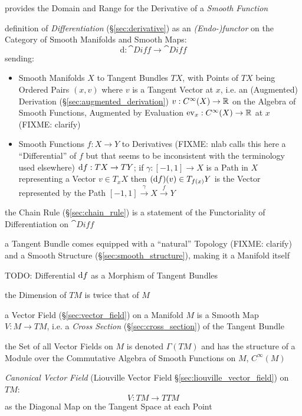 provides the Domain and Range for the Derivative of a \emph{Smooth Function}

definition of \emph{Differentiation} (\S\ref{sec:derivative}) as an
\emph{(Endo-)functor} on the Category of Smooth Manifolds and Smooth Maps:
\[
  \mathrm{d} : \cat{Diff} \rightarrow \cat{Diff}
\]
sending:
\begin{itemize}
  \item Smooth Manifolds $X$ to Tangent Bundles $T X$, with Points of $T X$
    being Ordered Pairs $(x, v)$ where $v$ is a Tangent Vector at $x$, i.e. an
    (Augmented) Derivation (\S\ref{sec:augmented_derivation}) $v : C^\infty(X)
    \rightarrow \mathbb{R}$ on the Algebra of Smooth Functions, Augmented by
    Evaluation $\mathrm{ev}_x : C^\infty(X) \rightarrow \mathbb{R}$ at $x$
    (FIXME: clarify)
  \item Smooth Functions $f : X \rightarrow Y$ to Derivatives (FIXME: nlab calls
    this here a ``Differential'' of $f$ but that seems to be inconsistent with
    the terminology used elsewhere) $\mathrm{d}f : TX \rightarrow TY$; if $\gamma
    : [-1,1] \rightarrow X$ is a Path in $X$ representing a Vector
    $v \in T_x{X}$ then $(\mathrm{d}f)(v) \in T_{f(x)}Y$ is the Vector represented
    by the Path $[-1, 1] \xrightarrow{\gamma} X \xrightarrow{f} Y$
\end{itemize}

the Chain Rule (\S\ref{sec:chain_rule}) is a statement of the Functoriality of
Differentiation on $\cat{Diff}$

a Tangent Bundle comes equipped with a ``natural'' Topology (FIXME: clarify)
and a Smooth Structure (\S\ref{sec:smooth_structure}), making it a Manifold
itself

TODO: Differential $\mathrm{d}f$ as a Morphism of Tangent Bundles

the Dimension of $T M$ is twice that of $M$

a Vector Field (\S\ref{sec:vector_field}) on a Manifold $M$ is a Smooth Map $V
: M \rightarrow T M$, i.e. a \emph{Cross Section} (\S\ref{sec:cross_section})
of the Tangent Bundle

the Set of all Vector Fields on $M$ is denoted $\Gamma(TM)$ and has the
structure of a Module over the Commutative Algebra of Smooth Functions on $M$,
$C^\infty(M)$

\emph{Canonical Vector Field} (Liouville Vector Field
\S\ref{sec:liouville_vector_field}) on $TM$:
\[
  V : TM \rightarrow TTM
\]
as the Diagonal Map on the Tangent Space at each Point

